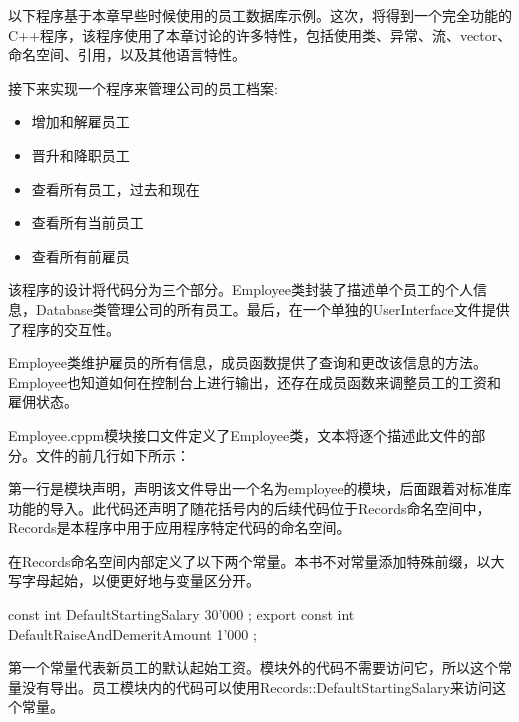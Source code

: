 
以下程序基于本章早些时候使用的员工数据库示例。这次，将得到一个完全功能的C++程序，该程序使用了本章讨论的许多特性，包括使用类、异常、流、vector、命名空间、引用，以及其他语言特性。


接下来实现一个程序来管理公司的员工档案:

\begin{itemize}
\item
增加和解雇员工

\item
晋升和降职员工

\item
查看所有员工，过去和现在

\item
查看所有当前员工

\item
查看所有前雇员
\end{itemize}

该程序的设计将代码分为三个部分。Employee类封装了描述单个员工的个人信息，Database类管理公司的所有员工。最后，在一个单独的UserInterface文件提供了程序的交互性。


Employee类维护雇员的所有信息，成员函数提供了查询和更改该信息的方法。Employee也知道如何在控制台上进行输出，还存在成员函数来调整员工的工资和雇佣状态。


Employee.cppm模块接口文件定义了Employee类，文本将逐个描述此文件的部分。文件的前几行如下所示：

\begin{cpp}
export module employee;
import std;
namespace Records {
\end{cpp}

第一行是模块声明，声明该文件导出一个名为employee的模块，后面跟着对标准库功能的导入。此代码还声明了随花括号内的后续代码位于Records命名空间中，Records是本程序中用于应用程序特定代码的命名空间。

在Records命名空间内部定义了以下两个常量。本书不对常量添加特殊前缀，以大写字母起始，以便更好地与变量区分开。

\begin{cpp}
const int DefaultStartingSalary { 30'000 };
export const int DefaultRaiseAndDemeritAmount { 1'000 };
\end{cpp}

第一个常量代表新员工的默认起始工资。模块外的代码不需要访问它，所以这个常量没有导出。员工模块内的代码可以使用Records::DefaultStartingSalary来访问这个常量。

